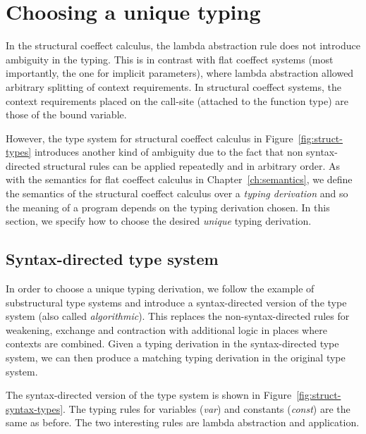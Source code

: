 
\section{Choosing a unique typing}
\label{sec:struct-unique}

In the structural coeffect calculus, the lambda abstraction rule does not introduce ambiguity
in the typing. This is in contrast with flat coeffect systems (most importantly, the one for
implicit parameters), where lambda abstraction allowed arbitrary splitting of context requirements.
In structural coeffect systems, the context requirements placed on the call-site (attached to
the function type) are those of the bound variable.

However, the type system for structural coeffect calculus in Figure~\ref{fig:struct-types}
introduces another kind of ambiguity due to the fact that non syntax-directed structural rules
can be applied repeatedly and in arbitrary order. As with the semantics for flat coeffect calculus
in Chapter~\ref{ch:semantics}, we define the semantics of the structural coeffect calculus over
a \emph{typing derivation} and so the meaning of a program depends on the typing derivation chosen.
In this section, we specify how to choose the desired \emph{unique} typing derivation.


\subsection{Syntax-directed type system}

In order to choose a unique typing derivation, we follow the example of substructural type systems
\cite{substruct-attpl-intro} and introduce a syntax-directed version of the type system (also called
\emph{algorithmic}). This replaces the non-syntax-directed rules for weakening, exchange and
contraction with additional logic in places where contexts are combined. Given a typing derivation
in the syntax-directed type system, we can then produce a matching typing derivation in the original
type system.

The syntax-directed version of the type system is shown in Figure~\ref{fig:struct-syntax-types}.
The typing rules for variables (\emph{var}) and constants (\emph{const}) are the same as before.
The two interesting rules are lambda abstraction and application.

